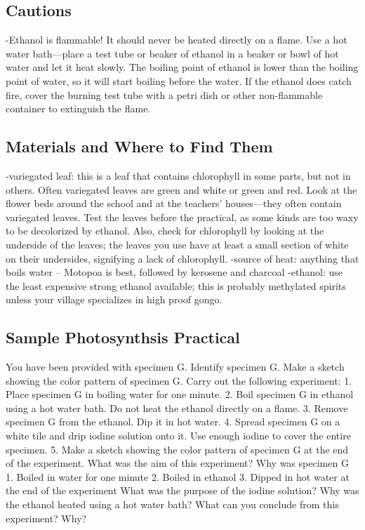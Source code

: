 \begin{enumerate}
\subsection{Cautions}
-Ethanol is flammable! It should never be heated directly on a flame. Use a hot water bath—place a test tube or beaker of ethanol in a beaker or bowl of hot water and let it heat slowly. The boiling point of ethanol is lower than the boiling point of water, so it will start boiling before the water. If the ethanol does catch fire, cover the burning test tube with a petri dish or other non-flammable container to extinguish the flame.

\subsection{Materials and Where to Find Them}
-variegated leaf: this is a leaf that contains chlorophyll in some parts, but not in others. Often variegated leaves are green and white or green and red. Look at the flower beds around the school and at the teachers’ houses—they often contain variegated leaves. Test the leaves before the practical, as some kinds are too waxy to be decolorized by ethanol. Also, check for chlorophyll by looking at the underside of the leaves; the leaves you use have at least a small section of white on their undersides, signifying a lack of chlorophyll.
-source of heat: anything that boils water – Motopoa is best, followed by kerosene and charcoal
-ethanol: use the least expensive strong ethanol available; this is probably methylated spirits unless your village specializes in high proof gongo.

\subsection{Sample Photosynthsis Practical}

You have been provided with specimen G. 
Identify specimen G.
Make a sketch showing the color pattern of specimen G.
Carry out the following experiment:
1. Place specimen G in boiling water for one minute. 
2. Boil specimen G in ethanol using a hot water bath. Do not heat the ethanol directly on a flame. 
3. Remove specimen G from the ethanol. Dip it in hot water.
4. Spread specimen G on a white tile and drip iodine solution onto it. Use enough iodine to cover the entire specimen.
5. Make a sketch showing the color pattern of specimen G at the end of the experiment.
What was the aim of this experiment?
Why was specimen G
1. Boiled in water for one minute
2. Boiled in ethanol
3. Dipped in hot water at the end of the experiment
What was the purpose of the iodine solution? 
Why was the ethanol heated using a hot water bath?
What can you conclude from this experiment? Why?
	 

\end{enumerate}

